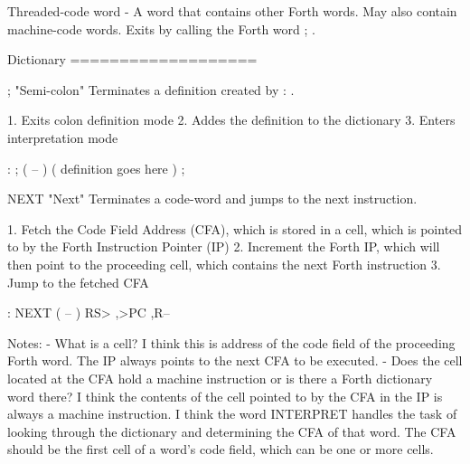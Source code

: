 \documentclass[
    letterpaper, %
	fontsize=10pt, %
	twoside=true, %
	numbers=noenddot, %
]{kaobook}
\begin{document}
Threaded-code word - A word that contains other Forth words. May also 
    contain machine-code words. Exits by calling the Forth word ; .



Dictionary
===================

;  "Semi-colon"
Terminates a definition created by : .

1. Exits colon definition mode
2. Addes the definition to the dictionary
3. Enters interpretation mode

    : ; ( -- )
        ( definition goes here ) ;


NEXT  "Next"
Terminates a code-word and jumps to the next instruction.

1. Fetch the Code Field Address (CFA),
   which is stored in a cell,
   which is pointed to by the Forth Instruction Pointer (IP)
2. Increment the Forth IP,
   which will then point to the proceeding cell,
   which contains the next Forth instruction
3. Jump to the fetched CFA

    : NEXT ( -- )
        RS> ,>PC ,R--


Notes:
   - What is a cell? I think this is address of the code field of the
   proceeding Forth word. The IP always points to the next CFA to be
   executed.
   - Does the cell located at the CFA hold a machine instruction or
   is there a Forth dictionary word there? I think the contents of the
   cell pointed to by the CFA in the IP is always a machine instruction.
   I think the word INTERPRET handles the task of looking through the
   dictionary and determining the CFA of that word. The CFA should be
   the first cell of a word's code field, which can be one or more cells.
























%

\end{document}
